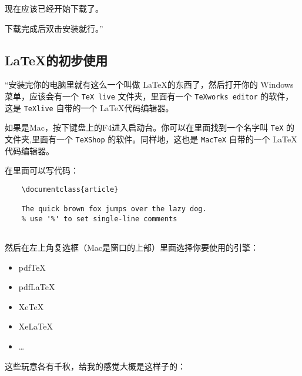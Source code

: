 现在应该已经开始下载了。

下载完成后双击安装就行。''



\subsection{\LaTeX 的初步使用}

“安装完你的电脑里就有这么一个叫做 \LaTeX 的东西了，然后打开你的 Windows 菜单，应该会有一个 \verb"TeX live" 文件夹，里面有一个 \verb"TeXworks editor" 的软件，这是 \verb"TeXlive" 自带的一个 \LaTeX 代码编辑器。

如果是Mac，按下键盘上的F4进入启动台。你可以在里面找到一个名字叫 \verb"TeX" 的文件夹,里面有一个 \verb"TeXShop" 的软件。同样地，这也是 \verb"MacTeX" 自带的一个 \LaTeX 代码编辑器。

在里面可以写代码：

\begin{lstlisting}
    \documentclass{article}
    
    The quick brown fox jumps over the lazy dog.
    % use '%' to set single-line comments
    
\end{lstlisting}

然后在左上角复选框（Mac是窗口的上部）里面选择你要使用的引擎：

\begin{itemize}\ttfamily
    \item pdfTeX
    \item pdfLaTeX
    \item XeTeX
    \item XeLaTeX
    \item \dots
\end{itemize}

这些玩意各有千秋，给我的感觉大概是这样子的：

